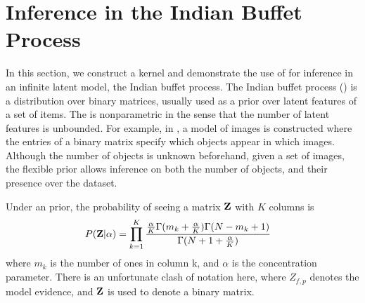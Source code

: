 




\section{Inference in the Indian Buffet Process}

In this section, we construct a kernel and demonstrate the use of \bq{} for inference in an infinite latent model, the Indian buffet process.  The Indian buffet process (\ibp{}) \cite{griffiths2005infinite} is a distribution over binary matrices, usually used as a prior over latent features of a set of items.  The \ibp{} is nonparametric in the sense that the number of latent features is unbounded.
%
For example, in \cite{griffiths2005infinite}, a model of images is constructed where the entries of a binary matrix specify which objects appear in which images.  Although the number of objects is unknown beforehand, given a set of images, the flexible \ibp{} prior allows inference on both the number of objects, and their presence over the dataset.

Under an \ibp{} prior, the probability of seeing a matrix $\mathbf{Z}$ with $K$ columns is
%
\begin{align}
P(\mathbf{Z}|\alpha) & = \prod_{k=1}^K \frac{ \frac{ \alpha}{K} \Gamma(m_k + \frac{\alpha}{K}) \Gamma(N - m_k + 1)}{ \Gamma( N + 1 + \frac{\alpha}{K} ) }
\label{eq:IBP_prior}
\end{align}
%
where $m_k$ is the number of ones in column k, and $\alpha$ is the concentration parameter.  There is an unfortunate clash of notation here, where $Z_{f,p}$ denotes the model evidence, and $\mathbf{Z}$ is used to denote a binary matrix.

